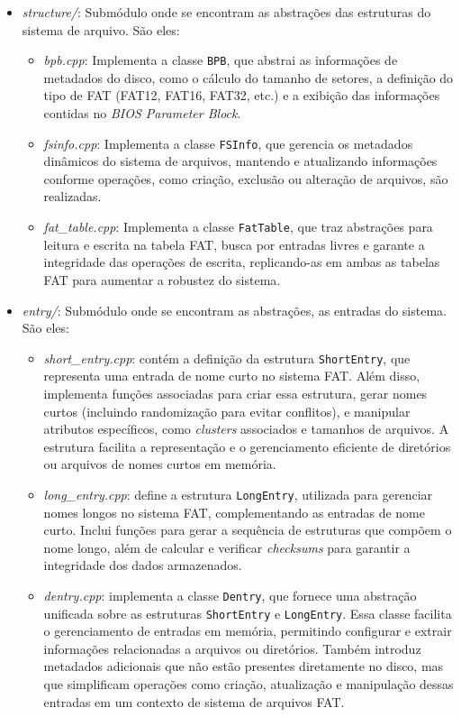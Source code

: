 \documentclass[
    12pt,				%
    oneside,   	        %
    a4paper,			%
    english,			%
    french,				%
    spanish,			%
    brazil,				%
    ]{pacotes/abntex2}
\begin{document}
\begin{itemize} 
    \item \textit{structure/}: Submódulo onde se encontram as abstrações das estruturas do sistema de arquivo. São eles:
    \begin{itemize} 
        \item \textit{bpb.cpp}: Implementa a classe \texttt{BPB}, que abstrai as informações de metadados do disco, como o cálculo do tamanho de setores, a definição do tipo de FAT (FAT12, FAT16, FAT32, etc.) e a exibição das informações contidas no \textit{BIOS Parameter Block}. 
        
        \item \textit{fsinfo.cpp}: Implementa a classe \texttt{FSInfo}, que gerencia os metadados dinâmicos do sistema de arquivos, mantendo e atualizando informações conforme operações, como criação, exclusão ou alteração de arquivos, são realizadas. 
        
        \item \textit{fat\_table.cpp}: Implementa a classe \texttt{FatTable}, que traz abstrações para leitura e escrita na tabela FAT, busca por entradas livres e garante a integridade das operações de escrita, replicando-as em ambas as tabelas FAT para aumentar a robustez do sistema.
    \end{itemize}

    \item \textit{entry/}: Submódulo onde se encontram as abstrações, as entradas do sistema. São eles:
    \begin{itemize} 
        \item\textit{short\_entry.cpp}: contém a definição da estrutura \texttt{ShortEntry}, que representa uma entrada de nome curto no sistema FAT. Além disso, implementa funções associadas para criar essa estrutura, gerar nomes curtos (incluindo randomização para evitar conflitos), e manipular atributos específicos, como \textit{clusters} associados e tamanhos de arquivos. A estrutura facilita a representação e o gerenciamento eficiente de diretórios ou arquivos de nomes curtos em memória.

        \item \textit{long\_entry.cpp}: define a estrutura \texttt{LongEntry}, utilizada para gerenciar nomes longos no sistema FAT, complementando as entradas de nome curto. Inclui funções para gerar a sequência de estruturas que compõem o nome longo, além de calcular e verificar \textit{checksums} para garantir a integridade dos dados armazenados.

        \item \textit{dentry.cpp}: implementa a classe \texttt{Dentry}, que fornece uma abstração unificada sobre as estruturas \texttt{ShortEntry} e \texttt{LongEntry}. Essa classe facilita o gerenciamento de entradas em memória, permitindo configurar e extrair informações relacionadas a arquivos ou diretórios. Também introduz metadados adicionais que não estão presentes diretamente no disco, mas que simplificam operações como criação, atualização e manipulação dessas entradas em um contexto de sistema de arquivos FAT.
    \end{itemize}
\end{itemize}
\end{document}
